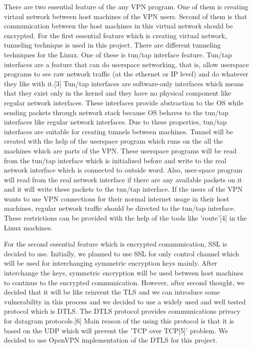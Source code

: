 \documentclass[letterpaper, 10 pt, conference]{ieeeconf}  %
\begin{document}
There are two essential feature of the any VPN program. One of them is creating virtaul network between host machines of the VPN users. Second of them is that communication between the host machines in this virtual network should be encrypted. 
For the first essential feature which is creating virtual network, tunneling technique is used in this project. There are different tunneling techniques for the Linux. One of these is tun/tap interface feature. Tun/tap interfaces are a feature that can do userspace networking, that is, allow userspace programs to see raw network traffic (at the ethernet or IP level) and do whatever they like with it.[3] Tun/tap interfaces are software-only interfaces which means that they exist only in the kernel and they have no physical component like regular network interfaces. These interfaces provide abstraction to the OS while sending packets through network stack because OS behaves to the tun/tap interfaces like regular network interfaces. Due to these properties, tun/tap interfaces are suitable for creating tunnels between machines. Tunnel will be created with the help of the userspace program which runs on the all the machines which are parts of the VPN. These userspace programs will be read from the tun/tap interface which is initialized before and write to the real network interface which is connected to outside word. Also, user-space program will read from the real network interface if there are any available packets on it and it will write these packets to the tun/tap interface. If the users of the VPN wants to use VPN connections for their normal internet usage in their host machines, regular network traffic should be directed to the tun/tap interface. These restrictions can be provided with the help of the tools like 'route'[4] in  the Linux machines.

For the second essential feature which is encrypted communication, SSL is decided to use. 
Initially, we planned to use SSL for only control channel which will be used for interchanging symmetric encryption keys mainly. After interchange the keys, symmetric encryption will be used between host machines to continue to the encrypted communication. However, after second thought, we decided that it will be like reinvent the TLS and we can introduce some vulnerability in this process and we decided to use a widely used and well tested protocol which is DTLS. The DTLS protocol provides communications privacy for datagram protocols.[6] Main reason of the using this protocol is that it is based on the UDP which will prevent the  'TCP over TCP[5]' problem. We decided to use OpenVPN implementation of the DTLS for this project. 
\end{document}
